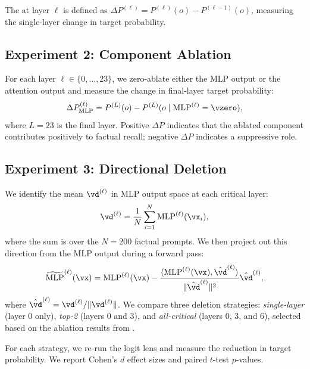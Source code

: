 The  at layer $\ell$ is defined as $\Delta P^{(\ell)} = P^{(\ell)}(o) - P^{(\ell-1)}(o)$, measuring the single-layer change in target probability.

\subsection{Experiment 2: Component Ablation}
\label{sec:exp2}

For each layer $\ell \in \{0, \ldots, 23\}$, we zero-ablate either the MLP output or the attention output and measure the change in final-layer target probability:
\begin{equation}
    \Delta P_{\text{MLP}}^{(\ell)} = P^{(L)}(o) - P^{(L)}(o \mid \text{MLP}^{(\ell)} = \vzero),
    \label{eq:ablation}
\end{equation}
where $L = 23$ is the final layer. Positive $\Delta P$ indicates that the ablated component contributes positively to factual recall; negative $\Delta P$ indicates a suppressive role.

\subsection{Experiment 3: Directional Deletion}
\label{sec:exp3}

We identify the mean  $\vd^{(\ell)}$ in MLP output space at each critical layer:
\begin{equation}
    \vd^{(\ell)} = \frac{1}{N} \sum_{i=1}^{N} \text{MLP}^{(\ell)}(\vx_i),
    \label{eq:fact_direction}
\end{equation}
where the sum is over the $N = 200$ factual prompts. We then project out this direction from the MLP output during a forward pass:
\begin{equation}
    \widetilde{\text{MLP}}^{(\ell)}(\vx) = \text{MLP}^{(\ell)}(\vx) - \frac{\langle \text{MLP}^{(\ell)}(\vx), \hat{\vd}^{(\ell)} \rangle}{\|\hat{\vd}^{(\ell)}\|^2} \hat{\vd}^{(\ell)},
    \label{eq:projection}
\end{equation}
where $\hat{\vd}^{(\ell)} = \vd^{(\ell)} / \|\vd^{(\ell)}\|$. We compare three deletion strategies: \emph{single-layer} (layer 0 only), \emph{top-2} (layers 0 and 3), and \emph{all-critical} (layers 0, 3, and 6), selected based on the ablation results from .

For each strategy, we re-run the logit lens and measure the reduction in target probability. We report Cohen's $d$ effect sizes and paired $t$-test $p$-values.

